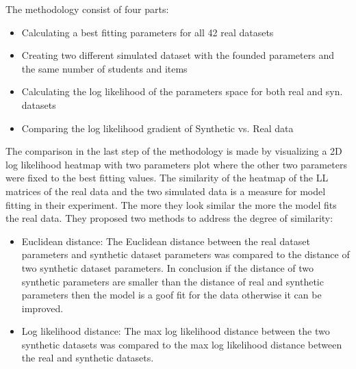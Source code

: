 The methodology consist of four parts:
\begin{itemize}
\item Calculating a best fitting parameters for all 42 real datasets
\item Creating two different simulated dataset with the founded parameters and the same number of students and items
\item Calculating the log likelihood of the parameters space for both real and syn. datasets
\item Comparing the log likelihood gradient of Synthetic vs. Real data
\end{itemize}

The comparison in the last step of the methodology is made by visualizing  a 2D log likelihood heatmap with two parameters plot where the other two parameters were fixed to the best fitting values. The similarity of the heatmap of the LL matrices of the real data and the two simulated data is a measure for model fitting in their experiment. The more they look similar the more the model fits the real data. They proposed two methods to address the degree of similarity:
\begin{itemize}
\item Euclidean distance: The Euclidean distance between the real dataset parameters and synthetic dataset parameters was compared to the distance of two synthetic dataset parameters. In conclusion if the distance of two synthetic parameters are smaller than the distance of real and synthetic parameters then the model is a goof fit for the data otherwise it can be improved.
\item Log likelihood distance: The max log likelihood distance between the two synthetic datasets was compared to the max log likelihood distance between the real and synthetic datasets. 
\end{itemize}
